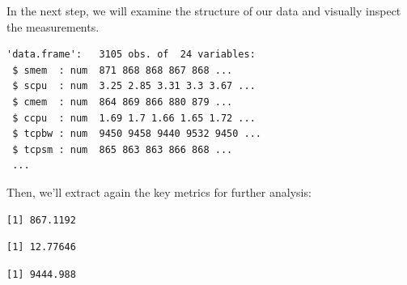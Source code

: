 In the next step, we will examine the structure of our data and visually
inspect the measurements.

\begin{Shaded}
\begin{Highlighting}[]
\end{Highlighting}
\end{Shaded}

\begin{verbatim}
'data.frame':   3105 obs. of  24 variables:
 $ smem  : num  871 868 868 867 868 ...
 $ scpu  : num  3.25 2.85 3.31 3.3 3.67 ...
 $ cmem  : num  864 869 866 880 879 ...
 $ ccpu  : num  1.69 1.7 1.66 1.65 1.72 ...
 $ tcpbw : num  9450 9458 9440 9532 9450 ...
 $ tcpsm : num  865 863 863 866 868 ...
 ...
\end{verbatim}

Then, we'll extract again the key metrics for further analysis:

\begin{Shaded}
\begin{Highlighting}[]
\SpecialCharTok{\$}
\end{Highlighting}
\end{Shaded}

\begin{verbatim}
[1] 867.1192
\end{verbatim}

\begin{Shaded}
\begin{Highlighting}[]
\SpecialCharTok{\$}
\end{Highlighting}
\end{Shaded}

\begin{verbatim}
[1] 12.77646
\end{verbatim}

\begin{Shaded}
\begin{Highlighting}[]
\SpecialCharTok{\$}
\end{Highlighting}
\end{Shaded}

\begin{verbatim}
[1] 9444.988
\end{verbatim}

\begin{Shaded}
\begin{Highlighting}[]
\SpecialCharTok{\$}
\end{Highlighting}
\end{Shaded}

